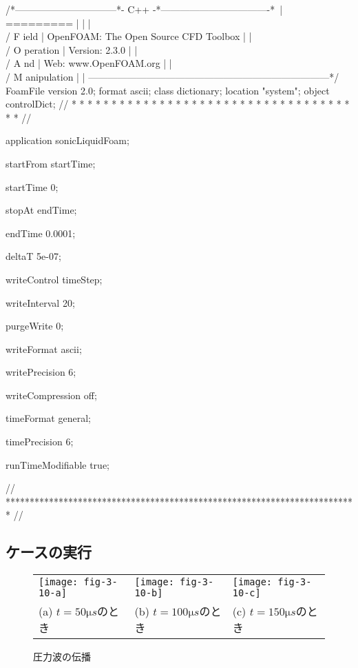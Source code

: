 \begin{OFverbatim}
/*--------------------------------*- C++ -*----------------------------------*\
| =========                 |                                                 |
| \\      /  F ield         | OpenFOAM: The Open Source CFD Toolbox           |
|  \\    /   O peration     | Version:  2.3.0                                 |
|   \\  /    A nd           | Web:      www.OpenFOAM.org                      |
|    \\/     M anipulation  |                                                 |
\*---------------------------------------------------------------------------*/
FoamFile
{
    version     2.0;
    format      ascii;
    class       dictionary;
    location    "system";
    object      controlDict;
}
// * * * * * * * * * * * * * * * * * * * * * * * * * * * * * * * * * * * * * //

application     sonicLiquidFoam;

startFrom       startTime;

startTime       0;

stopAt          endTime;

endTime         0.0001;

deltaT          5e-07;

writeControl    timeStep;

writeInterval   20;

purgeWrite      0;

writeFormat     ascii;

writePrecision  6;

writeCompression off;

timeFormat      general;

timePrecision   6;

runTimeModifiable true;


// ************************************************************************* //
\end{OFverbatim}


\subsection{ケースの実行}
\label{ssec:3.4.4}


\begin{figure}[ht]
 \tabcolsep=1pt
 \begin{tabular}{lll}
  \texttt{[image: fig-3-10-a]} &
  \texttt{[image: fig-3-10-b]} &
  \texttt{[image: fig-3-10-c]} \\
  (a) $t =  50 \unit{\micro s}$のとき &
  (b) $t = 100 \unit{\micro s}$のとき &
  (c) $t = 150 \unit{\micro s}$のとき
 \end{tabular}
 \caption{圧力波の伝播}
 \label{fig:3.10}
\end{figure}


